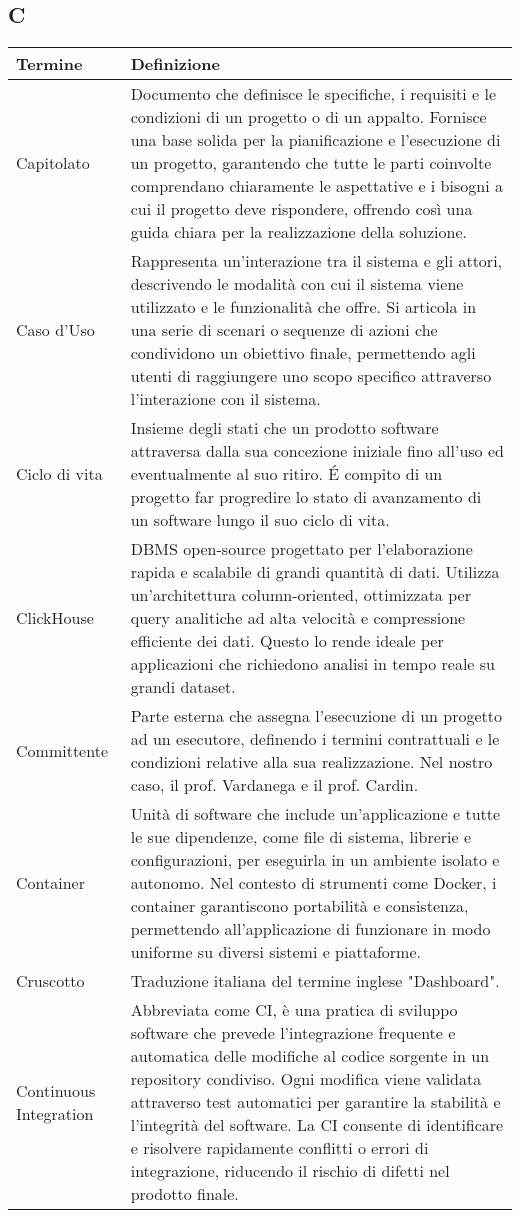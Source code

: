 \documentclass[10pt]{article}
\begin{document}
\subsection{C} %
\begin{longtable}{|>{\centering\arraybackslash}m{2.5cm}|>{\arraybackslash}m{12.5cm}|}
\hline
\rowcolor[gray]{0.8}
\textbf{Termine} & \textbf{Definizione}\\
\endhead
\hline
Capitolato & Documento che definisce le specifiche, i requisiti e le condizioni di un progetto o di un appalto. Fornisce una base solida per la pianificazione e l’esecuzione di un progetto, garantendo che tutte le parti coinvolte comprendano chiaramente le aspettative e i bisogni a cui il progetto deve rispondere, offrendo così una guida chiara per la realizzazione della soluzione.\\
\hline
Caso d'Uso & Rappresenta un'interazione tra il sistema e gli attori, descrivendo le modalità con cui il sistema viene utilizzato e le funzionalità che offre. Si articola in una serie di scenari o sequenze di azioni che condividono un obiettivo finale, permettendo agli utenti di raggiungere uno scopo specifico attraverso l'interazione con il sistema.\\
\hline
Ciclo di vita & Insieme degli stati che un prodotto software attraversa dalla sua concezione iniziale fino all'uso ed eventualmente al suo ritiro. \'E compito di un progetto far progredire lo stato di avanzamento di un software lungo il suo ciclo di vita.\\
\hline
ClickHouse & DBMS open-source progettato per l'elaborazione rapida e scalabile di grandi quantità di dati. Utilizza un'architettura column-oriented, ottimizzata per query analitiche ad alta velocità e compressione efficiente dei dati. Questo lo rende ideale per applicazioni che richiedono analisi in tempo reale su grandi dataset.\\
\hline
Committente & Parte esterna che assegna l'esecuzione di un progetto ad un esecutore, definendo i termini contrattuali e le condizioni relative alla sua realizzazione. Nel nostro caso, il prof. Vardanega e il prof. Cardin.\\
\hline
Container & Unità di software che include un'applicazione e tutte le sue dipendenze, come file di sistema, librerie e configurazioni, per eseguirla in un ambiente isolato e autonomo. Nel contesto di strumenti come Docker, i container garantiscono portabilità e consistenza, permettendo all'applicazione di funzionare in modo uniforme su diversi sistemi e piattaforme.\\
\hline
Cruscotto & Traduzione italiana del termine inglese "Dashboard".\\
\hline
Continuous Integration & Abbreviata come CI, è una pratica di sviluppo software che prevede l'integrazione frequente e automatica delle modifiche al codice sorgente in un repository condiviso. Ogni modifica viene validata attraverso test automatici per garantire la stabilità e l'integrità del software. La CI consente di identificare e risolvere rapidamente conflitti o errori di integrazione, riducendo il rischio di difetti nel prodotto finale.\\
\hline
\end{longtable}
\end{document}
